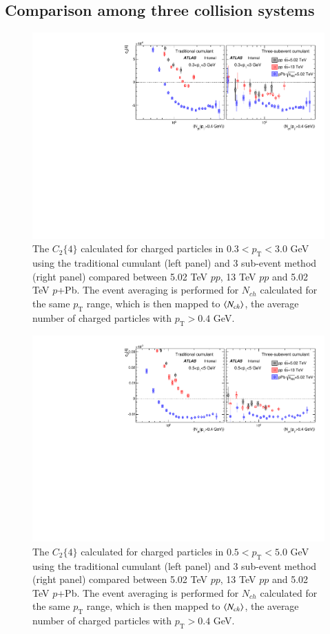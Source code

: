 \subsection{Comparison among three collision systems}
\begin{figure}[H]
\centering
\includegraphics[width=0.8\linewidth]{figs/sec_result/phy_sys_pt0_har0.pdf}
\caption{The $C_{2}\{4\}$ calculated for charged particles in $0.3<p_{\text{T}}<3.0$ GeV using the traditional cumulant (left panel) and 3 sub-event method (right panel) compared between 5.02 TeV $pp$, 13 TeV $pp$ and 5.02 TeV $p$+Pb. The event averaging is performed for $N_{ch}$ calculated for the same $p_{\text{T}}$ range, which is then mapped to $\left\langle N_{ch}\right\rangle$, the average number of charged particles with $p_{\text{T}}>0.4$ GeV.}
\label{fig:phy_sys_pt0_har0}
\end{figure}
\begin{figure}[H]
\centering
\includegraphics[width=0.8\linewidth]{figs/sec_result/phy_sys_pt1_har0.pdf}
\caption{The $C_{2}\{4\}$ calculated for charged particles in $0.5<p_{\text{T}}<5.0$ GeV using the traditional cumulant (left panel) and 3 sub-event method (right panel) compared between 5.02 TeV $pp$, 13 TeV $pp$ and 5.02 TeV $p$+Pb. The event averaging is performed for $N_{ch}$ calculated for the same $p_{\text{T}}$ range, which is then mapped to $\left\langle N_{ch}\right\rangle$, the average number of charged particles with $p_{\text{T}}>0.4$ GeV.}
\label{fig:phy_sys_pt1_har0}
\end{figure}
